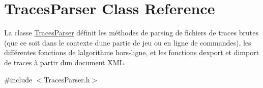 \hypertarget{class_traces_parser}{}\section{Traces\+Parser Class Reference}
\label{class_traces_parser}


La classe \hyperlink{class_traces_parser}{Traces\+Parser} définit les méthodes de parsing de fichiers de traces brutes (que ce soit dans le contexte d\textquotesingle{}une partie de jeu ou en ligne de commandes), les différentes fonctions de l\textquotesingle{}algorithme hors-\/ligne, et les fonctions d\textquotesingle{}export et d\textquotesingle{}import de traces à partir d\textquotesingle{}un document X\+ML.  




{\ttfamily \#include $<$Traces\+Parser.\+h$>$}

